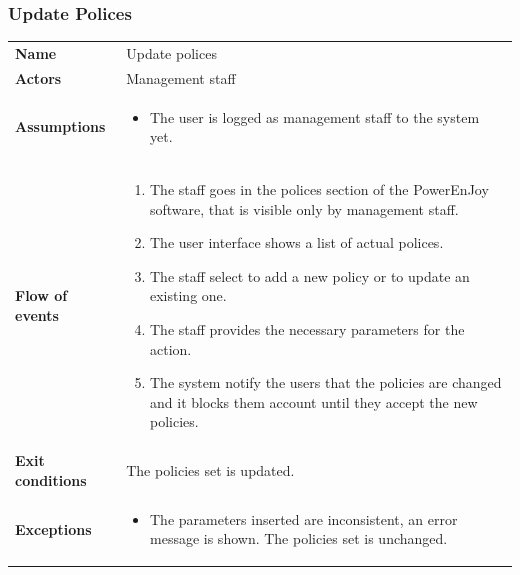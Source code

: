 \documentclass[english]{article}
\begin{document}
		\subsubsection{Update Polices}
		\begin{center}
		\begin{tabular}{l||p{10cm}}
		\textbf{Name} 
			& Update polices\\ [8px]
		\textbf{Actors} 
			& Management staff\\ [8px]
		\textbf{Assumptions} 
			& \begin{itemize}
				\item The user is logged as management staff to the system yet.
			\end{itemize}\\
		\textbf{Flow of events}
			& \begin{enumerate}
	 			\item The staff goes in the polices section of the PowerEnJoy software, that is visible only by management staff.
				\item The user interface shows a list of actual polices.
				\item The staff select to add a new policy or to update an existing one.
				\item The staff provides the necessary parameters for the action.
				\item The system notify the users that the policies are changed and it blocks them account until they accept the new policies.
			\end{enumerate}\\ 
		\textbf{Exit conditions}
			& The policies set is updated.\\ [8px]
		\textbf{Exceptions}
			& \begin{itemize}
				\item The parameters inserted are inconsistent, an error message is shown. The policies set is unchanged.
			\end{itemize}
		\end{tabular}
		\end{center}
		\noindent
\end{document}
